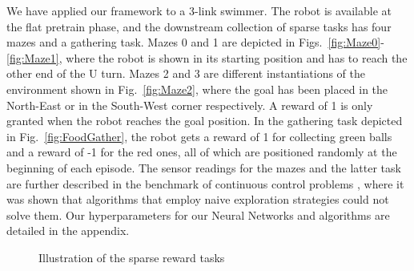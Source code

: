 \documentclass{article} %
\begin{document}
We have applied our framework to a 3-link swimmer. The robot is available at the flat pretrain phase, and the downstream collection of sparse tasks has four mazes and a gathering task. Mazes 0 and 1 are depicted in Figs.\ \ref{fig:Maze0}-\ref{fig:Maze1}, where the robot is shown in its starting position and has to reach the other end of the U turn. Mazes 2 and 3 are different instantiations of the environment shown in Fig.\ \ref{fig:Maze2}, where the goal has been placed in the North-East or in the South-West corner respectively. A reward of 1 is only granted when the robot reaches the goal position. In the gathering task depicted in Fig.\ \ref{fig:FoodGather}, the robot gets a reward of 1 for collecting green balls and a reward of -1 for the red ones, all of which are positioned randomly at the beginning of each episode. The sensor readings for the mazes and the latter task are further described in the benchmark of continuous control problems \citep{duan2016benchmarking}, where it was shown that algorithms that employ naive exploration strategies could not solve them. Our hyperparameters for our Neural Networks and algorithms are detailed in the appendix.

\begin{figure}[ht]
	\centering
	\caption{Illustration of the sparse reward tasks}
	\label{fig:snn_multimodal_MI}
\end{figure}
\end{document}
